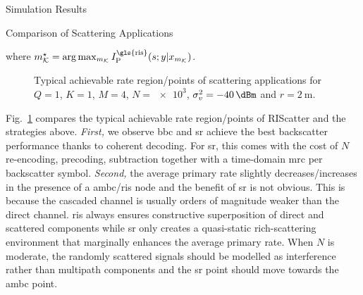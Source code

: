 \documentclass[journal]{IEEEtran}
\begin{document}
\begin{section}{Simulation Results}
\begin{subsection}{Comparison of Scattering Applications}
\begin{itemize}
\begin{equation}
			\end{equation}
			where $m_{\mathcal{K}}^{\star} = \arg \max_{m_{\mathcal{K}}} I_{\text{P}}^{\text{\gls{ris}}}(s;y|x_{m_{\mathcal{K}}})$.
		\end{itemize}
		\begin{figure}[!t]
			\centering
			\resizebox{0.65\columnwidth}{!}{
				
			}
			\caption{Typical achievable rate region/points of scattering applications for $Q=1$, $K=1$, $M=4$, $N=\num{e3}$, $\sigma_v^2=\SI{-40}{\dBm}$ and $r=\SI{2}{\meter}$.}
			\label{fg:region_comparison}
		\end{figure}

		Fig.~\ref{fg:region_comparison} compares the typical achievable rate region/points of RIScatter and the strategies above.
		\emph{First,} we observe \gls{bbc} and \gls{sr} achieve the best backscatter performance thanks to coherent decoding.
		For \gls{sr}, this comes with the cost of $N$ re-encoding, precoding, subtraction together with a time-domain \gls{mrc} per backscatter symbol.
		\emph{Second,} the average primary rate slightly decreases/increases in the presence of a \gls{ambc}/\gls{ris} node and the benefit of \gls{sr} is not obvious.
		This is because the cascaded channel is usually orders of magnitude weaker than the direct channel.
		\gls{ris} always ensures constructive superposition of direct and scattered components while \gls{sr} only creates a quasi-static rich-scattering environment that marginally enhances the average primary rate.
		When $N$ is moderate, the randomly scattered signals should be modelled as interference rather than multipath components and the \gls{sr} point should move towards the \gls{ambc} point.

\end{subsection}
\end{section}
\end{document}
